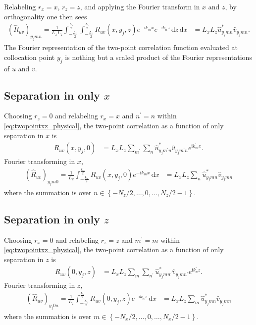 \documentclass[letterpaper,11pt,nointlimits,reqno]{amsart}
\newcommand{\ii}{\ensuremath{\mathrm{i}}}
\begin{document}
Relabeling $r_x = x$, $r_z = z$, and applying the Fourier transform in $x$ and
$z$, by orthogonality one then sees
\begin{align}
\left(\hat{R}_{uv}\right)_{y_j m n}
    =
    \frac{1}{L_x L_z}
    \int_{-\frac{L_x}{2}}^{\frac{L_x}{2}}
    \int_{-\frac{L_z}{2}}^{\frac{L_z}{2}}
    R_{uv} \left( x, y_j, z \right)
    e^{-\ii k_m x}
    e^{-\ii k_n z}
    \,\mathrm{d}z
    \,\mathrm{d}x
    &=
    L_x L_z
    \hat{u}^\ast_{y_j m n}
    \hat{v}_{y_j m n}.
    \label{eq:twopointxz_wave}
\end{align}
The Fourier representation of the two-point correlation function evaluated at
collocation point $y_j$ is nothing but a scaled product of the Fourier
representations of $u$ and $v$.

\subsection{Separation in only $x$}

Choosing $r_z = 0$ and relabeling $r_x = x$ and $n^\prime = n$ within
\eqref{eq:twopointxz_physical}, the two-point correlation as a
function of only separation in $x$ is
\begin{align}
R_{uv} \left( x, y_j, 0 \right)
  &= L_x L_z
     \sum_{m^\prime}
     \sum_{n}
     \hat{u}^\ast_{y_j m^\prime n}
     \hat{v}_{y_j m^\prime n}
     e^{\ii k_m^\prime x}.
    \label{eq:twopointx_physical}
\end{align}
Fourier transforming in $x$,
\begin{align}
\left(\hat{R}_{uv}\right)_{y_j m 0}
   =
    \frac{1}{L_x}
    \int_{-\frac{L_x}{2}}^{\frac{L_x}{2}}
    R_{uv} \left( x, y_j, 0 \right)
    e^{-\ii k_m x}
    \,\mathrm{d}x
  &=
    L_x L_z
    \sum_{n}
    \hat{u}^\ast_{y_j m n}
    \hat{v}_{y_j m n}
    \label{eq:twopointx_wave}
\end{align}
where the summation is over $n \in \left\{-N_z/2, \dots, 0, \dots,
N_z/2-1\right\}$.

\subsection{Separation in only $z$}

Choosing $r_x = 0$ and relabeling $r_z = z$ and $m^\prime = m$ within
\eqref{eq:twopointxz_physical}, the two-point correlation as a
function of only separation in $z$ is
\begin{align}
R_{uv} \left( 0, y_j, z \right)
  &= L_x L_z
     \sum_{m}
     \sum_{n^\prime}
     \hat{u}^\ast_{y_j m n^\prime}
     \hat{v}_{y_j m n^\prime}
     e^{\ii k_n^\prime z}.
    \label{eq:twopointz_physical}
\end{align}
Fourier transforming in $z$,
\begin{align}
\left(\hat{R}_{uv}\right)_{y_j 0 n}
   =
    \frac{1}{L_z}
    \int_{-\frac{L_z}{2}}^{\frac{L_z}{2}}
    R_{uv} \left( 0, y_j, z \right)
    e^{-\ii k_n z}
    \,\mathrm{d}x
  &=
    L_x L_z
    \sum_{m}
    \hat{u}^\ast_{y_j m n}
    \hat{v}_{y_j m n}
    \label{eq:twopointz_wave}
\end{align}
where the summation is over $m \in \left\{-N_x/2, \dots, 0, \dots,
N_x/2-1\right\}$.
\end{document}
